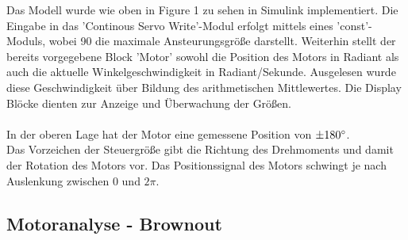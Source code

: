 \documentclass{article}
\begin{document}
Das Modell wurde wie oben in Figure 1 zu sehen in Simulink implementiert.
Die Eingabe in das 'Continous Servo Write'-Modul erfolgt mittels eines 'const'-Moduls, wobei 90 die maximale Ansteurungsgröße darstellt.
Weiterhin stellt der bereits vorgegebene Block 'Motor' sowohl die Position des Motors in Radiant als auch die aktuelle Winkelgeschwindigkeit in Radiant/Sekunde.
Ausgelesen wurde diese Geschwindigkeit über Bildung des arithmetischen Mittlewertes.
Die Display Blöcke dienten zur Anzeige und Überwachung der Größen.\\
\\In der oberen Lage hat der Motor eine gemessene Position von $\pm180\degree$. 
\\Das Vorzeichen der Steuergröße gibt die Richtung des Drehmoments und damit der Rotation des Motors vor.
Das Positionssignal des Motors schwingt je nach Auslenkung zwischen 0 und $2\pi$.\\
\newpage

\subsection{Motoranalyse - Brownout}
\vspace{5mm}
\end{document}
